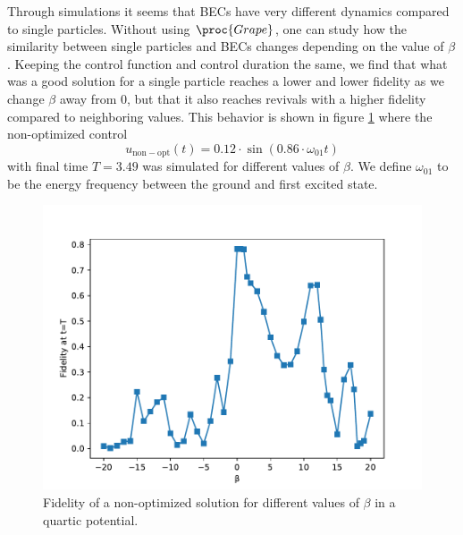 \documentclass[aps,pra,reprint,superscriptaddress]{revtex4-1}
\begin{document}
Through simulations it seems that BECs have very different dynamics compared to single particles. Without using $\proc{Grape}$, one can study how the similarity between single particles and BECs changes depending on the value of $\beta$. Keeping the control function and control duration the same, we find that what was a good solution for a single particle reaches a lower and lower fidelity as we change $\beta$ away from 0, but that it also reaches revivals with a higher fidelity compared to neighboring values. This behavior is shown in figure \ref{fig:beta} where the non-optimized control
\begin{equation}
	u_{\mathrm{non-opt}}(t)=0.12\cdot\sin(0.86\cdot \omega_{01} t)
	\label{eq:nonopt-control}
\end{equation} with final time $T=3.49$ was simulated for different values of $\beta$. We define $\omega_{01}$ to be the energy frequency between the ground and first excited state.

\begin{figure}[h]
	\includegraphics[width=\columnwidth]{graphics/exploration/nonOptBeta.pdf}
	\caption{Fidelity of a non-optimized solution for different values of $\beta$ in a quartic potential.}
	\label{fig:beta}
\end{figure}
\end{document}
